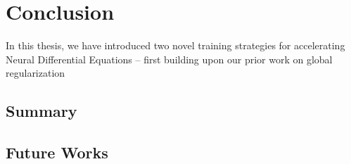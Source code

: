 \chapter{Conclusion}
\label{chapter:conclusion}

In this thesis, we have introduced two novel training strategies for accelerating Neural Differential Equations -- first building upon our prior work on global regularization~\citep{pal2021opening}

\section{Summary}
\label{sec:summary}

\section{Future Works}
\label{sec:future_works}

